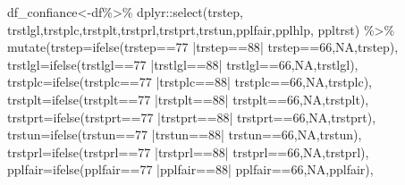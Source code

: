 \documentclass[
]{book}
\newenvironment{Shaded}{\begin{snugshade}}{\end{snugshade}}
\newcommand{\AttributeTok}[1]{\textcolor[rgb]{0.77,0.63,0.00}{#1}}
\newcommand{\ConstantTok}[1]{\textcolor[rgb]{0.00,0.00,0.00}{#1}}
\newcommand{\DecValTok}[1]{\textcolor[rgb]{0.00,0.00,0.81}{#1}}
\newcommand{\FunctionTok}[1]{\textcolor[rgb]{0.00,0.00,0.00}{#1}}
\newcommand{\NormalTok}[1]{#1}
\newcommand{\OtherTok}[1]{\textcolor[rgb]{0.56,0.35,0.01}{#1}}
\newcommand{\SpecialCharTok}[1]{\textcolor[rgb]{0.00,0.00,0.00}{#1}}
\begin{document}
\begin{Shaded}
\begin{Highlighting}[]
\NormalTok{df\_confiance}\OtherTok{\textless{}{-}}\NormalTok{df}\SpecialCharTok{\%\textgreater{}\%}
\NormalTok{  dplyr}\SpecialCharTok{::}\FunctionTok{select}\NormalTok{(trstep, trstlgl,trstplc,trstplt,trstprl,trstprt,trstun,pplfair,pplhlp, ppltrst) }\SpecialCharTok{\%\textgreater{}\%}
  \FunctionTok{mutate}\NormalTok{(}\AttributeTok{trstep=}\FunctionTok{ifelse}\NormalTok{(trstep}\SpecialCharTok{==}\DecValTok{77} \SpecialCharTok{|}\NormalTok{trstep}\SpecialCharTok{==}\DecValTok{88}\SpecialCharTok{|}\NormalTok{ trstep}\SpecialCharTok{==}\DecValTok{66}\NormalTok{,}\ConstantTok{NA}\NormalTok{,trstep),}
         \AttributeTok{trstlgl=}\FunctionTok{ifelse}\NormalTok{(trstlgl}\SpecialCharTok{==}\DecValTok{77} \SpecialCharTok{|}\NormalTok{trstlgl}\SpecialCharTok{==}\DecValTok{88}\SpecialCharTok{|}\NormalTok{ trstlgl}\SpecialCharTok{==}\DecValTok{66}\NormalTok{,}\ConstantTok{NA}\NormalTok{,trstlgl),}
         \AttributeTok{trstplc=}\FunctionTok{ifelse}\NormalTok{(trstplc}\SpecialCharTok{==}\DecValTok{77} \SpecialCharTok{|}\NormalTok{trstplc}\SpecialCharTok{==}\DecValTok{88}\SpecialCharTok{|}\NormalTok{ trstplc}\SpecialCharTok{==}\DecValTok{66}\NormalTok{,}\ConstantTok{NA}\NormalTok{,trstplc),}
         \AttributeTok{trstplt=}\FunctionTok{ifelse}\NormalTok{(trstplt}\SpecialCharTok{==}\DecValTok{77} \SpecialCharTok{|}\NormalTok{trstplt}\SpecialCharTok{==}\DecValTok{88}\SpecialCharTok{|}\NormalTok{ trstplt}\SpecialCharTok{==}\DecValTok{66}\NormalTok{,}\ConstantTok{NA}\NormalTok{,trstplt),}
         \AttributeTok{trstprt=}\FunctionTok{ifelse}\NormalTok{(trstprt}\SpecialCharTok{==}\DecValTok{77} \SpecialCharTok{|}\NormalTok{trstprt}\SpecialCharTok{==}\DecValTok{88}\SpecialCharTok{|}\NormalTok{ trstprt}\SpecialCharTok{==}\DecValTok{66}\NormalTok{,}\ConstantTok{NA}\NormalTok{,trstprt),}
         \AttributeTok{trstun=}\FunctionTok{ifelse}\NormalTok{(trstun}\SpecialCharTok{==}\DecValTok{77} \SpecialCharTok{|}\NormalTok{trstun}\SpecialCharTok{==}\DecValTok{88}\SpecialCharTok{|}\NormalTok{ trstun}\SpecialCharTok{==}\DecValTok{66}\NormalTok{,}\ConstantTok{NA}\NormalTok{,trstun),}
         \AttributeTok{trstprl=}\FunctionTok{ifelse}\NormalTok{(trstprl}\SpecialCharTok{==}\DecValTok{77} \SpecialCharTok{|}\NormalTok{trstprl}\SpecialCharTok{==}\DecValTok{88}\SpecialCharTok{|}\NormalTok{ trstprl}\SpecialCharTok{==}\DecValTok{66}\NormalTok{,}\ConstantTok{NA}\NormalTok{,trstprl),}
         \AttributeTok{pplfair=}\FunctionTok{ifelse}\NormalTok{(pplfair}\SpecialCharTok{==}\DecValTok{77} \SpecialCharTok{|}\NormalTok{pplfair}\SpecialCharTok{==}\DecValTok{88}\SpecialCharTok{|}\NormalTok{ pplfair}\SpecialCharTok{==}\DecValTok{66}\NormalTok{,}\ConstantTok{NA}\NormalTok{,pplfair),}

\end{Highlighting}
\end{Shaded}
\end{document}
